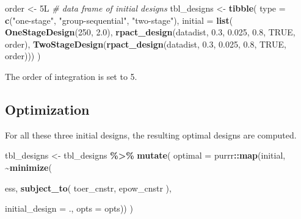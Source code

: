 \documentclass[
]{book}
\newenvironment{Shaded}{\begin{snugshade}}{\end{snugshade}}
\newcommand{\CommentTok}[1]{\textcolor[rgb]{0.56,0.35,0.01}{\textit{#1}}}
\newcommand{\DataTypeTok}[1]{\textcolor[rgb]{0.13,0.29,0.53}{#1}}
\newcommand{\DecValTok}[1]{\textcolor[rgb]{0.00,0.00,0.81}{#1}}
\newcommand{\FloatTok}[1]{\textcolor[rgb]{0.00,0.00,0.81}{#1}}
\newcommand{\KeywordTok}[1]{\textcolor[rgb]{0.13,0.29,0.53}{\textbf{#1}}}
\newcommand{\NormalTok}[1]{#1}
\newcommand{\OperatorTok}[1]{\textcolor[rgb]{0.81,0.36,0.00}{\textbf{#1}}}
\newcommand{\OtherTok}[1]{\textcolor[rgb]{0.56,0.35,0.01}{#1}}
\newcommand{\StringTok}[1]{\textcolor[rgb]{0.31,0.60,0.02}{#1}}
\begin{document}
\begin{Shaded}
\begin{Highlighting}[]
\NormalTok{order \textless{}{-}}\StringTok{ }\NormalTok{5L}
\CommentTok{\# data frame of initial designs }
\NormalTok{tbl\_designs \textless{}{-}}\StringTok{ }\KeywordTok{tibble}\NormalTok{(}
    \DataTypeTok{type    =} \KeywordTok{c}\NormalTok{(}\StringTok{"one{-}stage"}\NormalTok{, }\StringTok{"group{-}sequential"}\NormalTok{, }\StringTok{"two{-}stage"}\NormalTok{),}
    \DataTypeTok{initial =} \KeywordTok{list}\NormalTok{(}
        \KeywordTok{OneStageDesign}\NormalTok{(}\DecValTok{250}\NormalTok{, }\FloatTok{2.0}\NormalTok{),}
        \KeywordTok{rpact\_design}\NormalTok{(datadist, }\FloatTok{0.3}\NormalTok{, }\FloatTok{0.025}\NormalTok{, }\FloatTok{0.8}\NormalTok{, }\OtherTok{TRUE}\NormalTok{, order),}
        \KeywordTok{TwoStageDesign}\NormalTok{(}\KeywordTok{rpact\_design}\NormalTok{(datadist, }\FloatTok{0.3}\NormalTok{, }\FloatTok{0.025}\NormalTok{, }\FloatTok{0.8}\NormalTok{, }\OtherTok{TRUE}\NormalTok{, order))) )}
\end{Highlighting}
\end{Shaded}

The order of integration is set to 5.

\hypertarget{optimization-3}{%
\subsection{Optimization}\label{optimization-3}}

For all these three initial designs, the resulting optimal designs are
computed.

\begin{Shaded}
\begin{Highlighting}[]
\NormalTok{tbl\_designs \textless{}{-}}\StringTok{ }\NormalTok{tbl\_designs }\OperatorTok{\%\textgreater{}\%}\StringTok{ }
\StringTok{    }\KeywordTok{mutate}\NormalTok{(}
       \DataTypeTok{optimal =}\NormalTok{ purrr}\OperatorTok{::}\KeywordTok{map}\NormalTok{(initial, }\OperatorTok{\textasciitilde{}}\KeywordTok{minimize}\NormalTok{(}
         
\NormalTok{          ess,}
          \KeywordTok{subject\_to}\NormalTok{(}
\NormalTok{              toer\_cnstr,}
\NormalTok{              epow\_cnstr}
\NormalTok{          ),}
          
          \DataTypeTok{initial\_design =}\NormalTok{ ., }
          \DataTypeTok{opts           =}\NormalTok{ opts)) )}
\end{Highlighting}
\end{Shaded}
\end{document}
